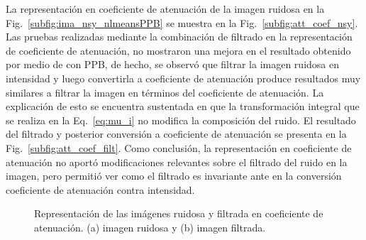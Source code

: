 La representación en coeficiente de atenuación de la imagen ruidosa en la Fig.~\ref{subfig:ima_nsy_nlmeansPPB} se muestra en la Fig.~\ref{subfig:att_coef_nsy}. Las pruebas realizadas mediante la combinación de filtrado en la representación de coeficiente de atenuación, no mostraron una mejora en el resultado obtenido por medio de \nlmeans con PPB, de hecho, se observó que filtrar la imagen ruidosa en intensidad y luego convertirla a coeficiente de atenuación produce resultados muy similares a filtrar la imagen en términos del coeficiente de atenuación. La explicación de esto se encuentra sustentada en que la transformación integral que se realiza en la Eq.~\ref{eq:mu_i} no modifica la composición del ruido. El resultado del filtrado y posterior conversión a coeficiente de atenuación se presenta en la Fig.~\ref{subfig:att_coef_filt}. Como conclusión, la representación en coeficiente de atenuación no aportó modificaciones relevantes sobre el filtrado del ruido en la imagen, pero permitió ver como el filtrado es invariante ante en la conversión coeficiente de atenuación contra intensidad.

\begin{figure}[ht!]
	\centering
	\caption[Representación de imágenes en coeficientes de atenuación]{Representación de las imágenes ruidosa y filtrada en coeficiente de atenuación. (a) imagen ruidosa y (b) imagen filtrada.}
	\label{fig:att_coeff}
\end{figure}

